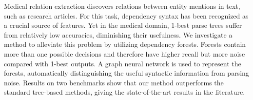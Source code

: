 Medical relation extraction discovers relations between entity mentions in text, such as research articles.
For this task, dependency syntax has been recognized as a crucial source of features.
Yet in the medical domain, 1-best parse trees suffer from relatively low accuracies, diminishing their usefulness.
We investigate a method to alleviate this problem by utilizing dependency forests.
Forests contain more than one possible decisions and therefore have higher recall but more noise compared with 1-best outputs.
A graph neural network is used to represent the forests, automatically distinguishing the useful syntactic information from parsing noise.
Results on two benchmarks show that our method outperforms the standard tree-based methods, giving the state-of-the-art results in the literature.